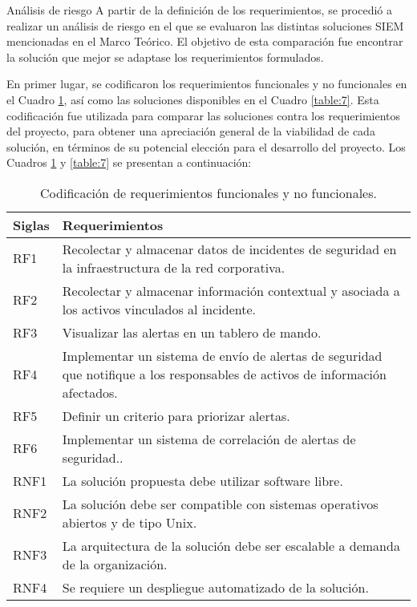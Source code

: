     \begin{section}{Análisis de riesgo}
    A partir de la definición de los requerimientos, se procedió a realizar un análisis de riesgo en el que se evaluaron las distintas soluciones SIEM mencionadas en el Marco Teórico. El objetivo de esta comparación fue encontrar la solución que mejor se adaptase los requerimientos formulados. \par
    En primer lugar, se codificaron los requerimientos funcionales y no funcionales en el Cuadro \ref{table:6}, así como las soluciones disponibles en el Cuadro \ref{table:7}. Esta codificación fue utilizada para comparar las soluciones contra los requerimientos del proyecto, para obtener una apreciación general de la viabilidad de cada solución, en términos de su potencial elección para el desarrollo del proyecto. Los Cuadros \ref{table:6} y \ref{table:7} se presentan a continuación:
    \begin{table}[H]
        \centering
        \begin{tabular}{|m{4em}|m{30em}|}
        
            \hline 
                Siglas  & Requerimientos \\ 
            \hline
                RF1 & Recolectar y almacenar datos de incidentes de seguridad en la infraestructura de la red corporativa. \\ 
            \hline
                RF2  & Recolectar y almacenar información contextual y asociada a los activos vinculados al incidente. \\ 
            \hline
                RF3 & Visualizar las alertas en un tablero de mando. \\
            \hline
                RF4 & Implementar un sistema de envío de alertas de seguridad que notifique a los responsables de activos de información afectados. \\
            \hline
                RF5 & Definir un criterio para priorizar alertas. \\
            \hline
                RF6 & Implementar un sistema de correlación de alertas de seguridad.. \\
            \hline
                RNF1 & La solución propuesta debe utilizar software libre. \\
            \hline
                RNF2 & La solución debe ser compatible con sistemas operativos abiertos y de tipo Unix. \\
            \hline
                RNF3 & La arquitectura de la solución debe ser escalable a demanda de la organización. \\
            \hline
                RNF4 & Se requiere un despliegue automatizado de la solución. \\
            \hline %
        \end{tabular}
        \caption{Codificación de requerimientos funcionales y no funcionales.}
        \label{table:6}
    \end{table}
    \begin{table}[H]
        \centering
        \begin{tabular}{|m{6em}|m{20em}|}
        

\end{tabular}
\end{table}
\end{section}
